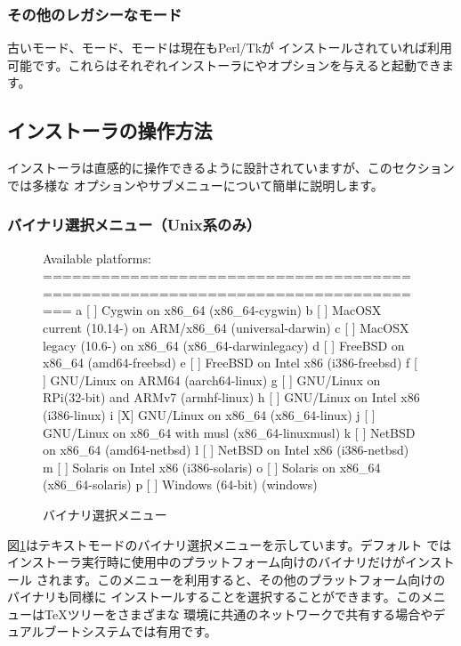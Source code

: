 \documentclass[uplatex,dvipdfmx]{jsarticle}
\begin{document}
\subsubsection{その他のレガシーなモード}

古いモード、モード、モードは現在もPerl/Tkが
インストールされていれば利用可能です。これらはそれぞれインストーラにやオプションを与えると起動できます。

\subsection{インストーラの操作方法}
\label{sec:runinstall}

インストーラは直感的に操作できるように設計されていますが、このセクションでは多様な
オプションやサブメニューについて簡単に説明します。

\subsubsection{バイナリ選択メニュー（Unix系のみ）}
\label{sec:binary}

\begin{figure}[tb]
\begin{boxedverbatim}
Available platforms:
===============================================================================
   a [ ] Cygwin on x86_64 (x86_64-cygwin)
   b [ ] MacOSX current (10.14-) on ARM/x86_64 (universal-darwin)
   c [ ] MacOSX legacy (10.6-) on x86_64 (x86_64-darwinlegacy)
   d [ ] FreeBSD on x86_64 (amd64-freebsd)
   e [ ] FreeBSD on Intel x86 (i386-freebsd)
   f [ ] GNU/Linux on ARM64 (aarch64-linux)
   g [ ] GNU/Linux on RPi(32-bit) and ARMv7 (armhf-linux)
   h [ ] GNU/Linux on Intel x86 (i386-linux)
   i [X] GNU/Linux on x86_64 (x86_64-linux)
   j [ ] GNU/Linux on x86_64 with musl (x86_64-linuxmusl)
   k [ ] NetBSD on x86_64 (amd64-netbsd)
   l [ ] NetBSD on Intel x86 (i386-netbsd)
   m [ ] Solaris on Intel x86 (i386-solaris)
   o [ ] Solaris on x86_64 (x86_64-solaris)
   p [ ] Windows (64-bit) (windows)
\end{boxedverbatim}
\vspace{-1zh}
\caption{バイナリ選択メニュー}\label{fig:bin-text}
\end{figure}

図\ref{fig:bin-text}はテキストモードのバイナリ選択メニューを示しています。デフォルト
ではインストーラ実行時に使用中のプラットフォーム向けのバイナリだけがインストール
されます。このメニューを利用すると、その他のプラットフォーム向けのバイナリも同様に
インストールすることを選択することができます。このメニューは\TeX ツリーをさまざまな
環境に共通のネットワークで共有する場合やデュアルブートシステムでは有用です。
\end{document}

